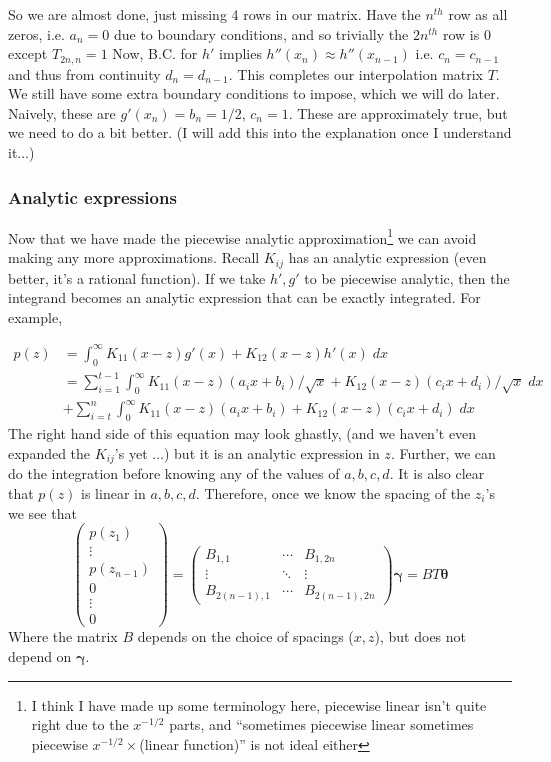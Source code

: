 \documentclass{article}
\newcommand{\bs}{\boldsymbol}                               %
\begin{document}
So we are almost done, just missing 4 rows in our matrix. Have the
$n^{th}$ row as all zeros, i.e. $a_n=0$ due to boundary conditions,
and so trivially the $2n^{th}$ row is 0 except $T_{2n,n} = 1 $
Now, B.C. for $h'$ implies $h''(x_n) \approx h''(x_{n-1})$ i.e.
$c_n=c_{n-1}$ and thus from continuity $d_n=d_{n-1}$. This completes
our interpolation matrix $T$. We still have some extra boundary
conditions to impose, which we will do later. Naively, these
are $g'(x_n) = b_n = 1/2$, $c_n=1$. These are approximately true, but
we need to do a bit better. (I will add this into the explanation
once I understand it$\dots$)  
\\
\subsubsection*{Analytic expressions}
Now that we have made the piecewise analytic approximation\footnote{
I think I have made up some terminology here, piecewise linear isn't
quite right due to the $x^{-1/2}$ parts, and ``sometimes piecewise linear
sometimes piecewise $x^{-1/2}\times$(linear function)'' is not ideal 
either} we can avoid making any more approximations. Recall
$K_{ij}$ has an analytic expression (even better, it's a rational function). 
If we take $h',g'$ to be piecewise
analytic, then the integrand becomes an analytic expression that can
be exactly integrated. For example,

\begin{align*} 
p(z) &= \int_0^{\infty} K_{11}(x-z) g'(x) + K_{12}(x-z) h'(x) \; dx \\
&= \sum_{i=1}^{t-1}\int_0^{\infty} K_{11}(x-z)(a_i x+ b_i)/\sqrt x 
 + K_{12}(x-z) (c_ix+d_i)/\sqrt x \; dx \\
&+ \sum_{i=t}^{n}\int_0^{\infty} K_{11}(x-z)(a_i x+ b_i) 
 + K_{12}(x-z) (c_ix+d_i) \; dx
\end{align*}
The right hand side of this equation may look ghastly, (and we haven't
even expanded the $K_{ij}$'s yet $\dots$) but it is an analytic expression
in $z$. Further, we can do the integration before knowing any of the
values of $a,b,c,d$. It is also clear that $p(z)$ is linear in $a,b,c,d$.
Therefore, once we know the spacing of the $z_i$'s we see that 
\[ \left( \begin{array}{c} p(z_1) \\ \vdots \\ p(z_{n-1}) \\[4pt] 0 \\ \vdots \\
0 \end{array} \right) =
\left( \begin{array}{ccc} B_{1,1} & \cdots & B_{1 , 2n} \\
\vdots & \ddots & \vdots \\ B_{2(n-1),1} & \cdots & B_{2(n-1) , 2n} 
\end{array}
\right) \bs{\gamma} = BT\bs{\theta} \]
Where the matrix $B$ depends on the choice of spacings ($x, z$), but does
not depend on $\bs{\gamma}$.
\end{document}

